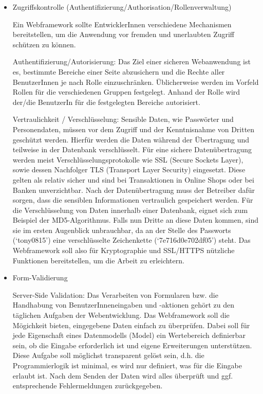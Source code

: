 \documentclass[
11pt, %
a4paper, %
BCOR25mm, %
DIV14, %
footsepline = false, %
headsepline, %
twoside, %
openright,
abstracton, %
listof=totocnumbered, %
bibliography=totocnumbered %
]{scrreprt}
\begin{document}
    \begin{itemize}
    \item Zugriffskontrolle (Authentifizierung/Authorisation/Rollenverwaltung)

Ein Webframework sollte EntwicklerInnen verschiedene Mechanismen bereitstellen,
um die Anwendung vor fremden und unerlaubten Zugriff schützen zu können.

Authentifizierung/Autorisierung: Das Ziel einer sicheren Webanwendung ist es,
bestimmte Bereiche einer Seite abzusichern und die Rechte aller BenutzerInnen
je nach Rolle einzuschränken. Üblicherweise werden im Vorfeld Rollen für die
verschiedenen Gruppen festgelegt. Anhand der Rolle wird der/die BenutzerIn für
die festgelegten Bereiche autorisiert.

Vertraulichkeit / Verschlüsselung: Sensible Daten, wie Passwörter und
Personendaten, müssen vor dem Zugriff und der Kenntnisnahme von Dritten
geschützt werden. Hierfür werden die Daten während der Übertragung und
teilweise in der Datenbank verschlüsselt. Für eine sichere Datenübertragung
werden meist Verschlüsselungsprotokolle wie SSL (Secure Sockets Layer), sowie
dessen Nachfolger TLS (Transport Layer Security) eingesetzt. Diese gelten als
relativ sicher und sind bei Transaktionen in Online Shops oder bei Banken
unverzichtbar. Nach der Datenübertragung muss der Betreiber dafür sorgen, dass
die sensiblen Informationen vertraulich gespeichert werden. Für die
Verschlüsselung von Daten innerhalb einer Datenbank, eignet sich zum Beispiel
der MD5-Algorithmus. Falls nun Dritte an diese Daten kommen, sind sie im ersten
Augenblick unbrauchbar, da an der Stelle des Passworts (‘tony0815’) eine
verschlüsselte Zeichenkette (‘7e716d0e702df05’) steht. Das Webframework soll
also für Kryptographie und SSL/HTTPS nützliche Funktionen bereitstellen, um die
Arbeit zu erleichtern.

    \item Form-Validierung

Server-Side Validation: Das Verarbeiten von Formularen bzw. die Handhabung von
BenutzerInneneingaben und -aktionen gehört zu den täglichen Aufgaben der
Webentwicklung. Das Webframework soll die Mögichkeit bieten, eingegebene Daten
einfach zu überprüfen. Dabei soll für jede Eigenschaft eines Datenmodells
(Model) ein Wertebereich definierbar sein, ob die Eingabe erforderlich ist und
eigene Erweiterungen unterstützen. Diese Aufgabe soll möglichst transparent
gelöst sein, d.h. die Programmierlogik ist minimal, es wird nur definiert, was
für die Eingabe erlaubt ist. Nach dem Senden der Daten wird alles überprüft und
ggf. entsprechende Fehlermeldungen zurückgegeben.


\end{itemize}
\end{document}
